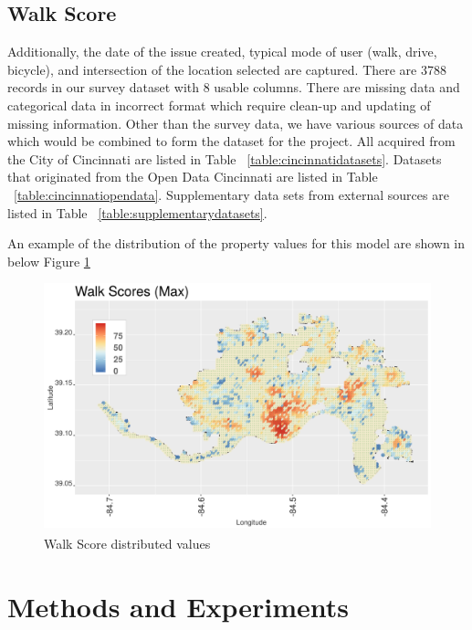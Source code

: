 \documentclass{llncs}
\begin{document}

\subsection{Walk Score\textsuperscript{\tiny\textregistered}}

Additionally, the date of the issue created, typical mode of user (walk, drive, bicycle), and intersection of the location selected are captured. There are 3788 records in our survey dataset with 8 usable columns. There are missing data and categorical data in incorrect format which require clean-up and updating of missing information. Other than the survey data, we have various sources of data which would be combined to form the dataset for the project. All acquired from the City of Cincinnati are listed in Table ~\ref{table:cincinnatidatasets}. Datasets that originated from the Open Data Cincinnati are listed in Table ~\ref{table:cincinnatiopendata}.  Supplementary data sets from external sources are listed in Table ~\ref{table:supplementarydatasets}.

An example of the distribution of the property values for this model are shown in below Figure \ref{figure : walkScore}

\FloatBarrier
\begin{figure}
 	\includegraphics[width=\textwidth, height=\textheight, keepaspectratio]{walkScore}
 	\caption{Walk Score\textsuperscript{\tiny\textregistered} distributed values}
	\label{figure : walkScore}
\end{figure}
\FloatBarrier


\section{Methods and Experiments}
\end{document}
